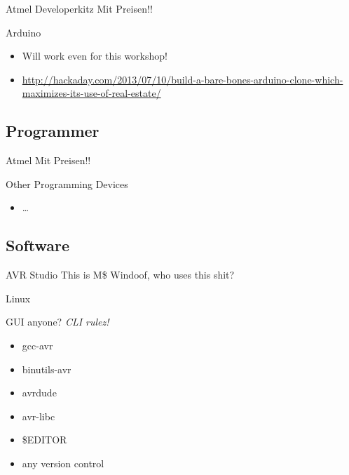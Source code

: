 \documentclass{beamer}
\begin{document}
\begin{frame}{Atmel Developerkitz}
    Mit Preisen!!
\end{frame}

\begin{frame}{Arduino}
    \begin{itemize}
        \item Will work even for this workshop!
        \item \url{http://hackaday.com/2013/07/10/build-a-bare-bones-arduino-clone-which-maximizes-its-use-of-real-estate/}
    \end{itemize}
\end{frame}

\subsection{Programmer}

\begin{frame}{Atmel}
    Mit Preisen!!
\end{frame}

\begin{frame}{Other Programming Devices}
    \begin{itemize}
        \item …
    \end{itemize}
\end{frame}

\subsection{Software}

\begin{frame}{AVR Studio}
    This is M\$ Windoof, who uses this shit?
\end{frame}

\begin{frame}{Linux}
    \begin{block}{GUI anyone?}
        \emph{CLI rulez!}
    \end{block}
    \begin{itemize}
        \item gcc-avr
        \item binutils-avr
        \item avrdude
        \item avr-libc
        \item \$EDITOR
        \item any version control
    \end{itemize}
\end{frame}
\end{document}
